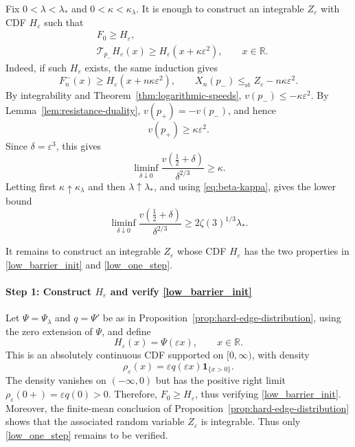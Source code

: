\documentclass[a4paper,fleqn]{cas-sc}
\numberwithin{equation}{section}
\theoremstyle{plain}
\theoremstyle{definition}
\newcommand{\stle}{\le_{\mathrm{st}}}
\begin{document}
Fix $0<\lambda<\lambda_*$ and $0<\kappa<\kappa_{\lambda}$.  It is enough to construct an
integrable \(Z_\varepsilon\) with CDF \(H_\varepsilon\) such that
\begin{align}
 &F_0\ge H_\varepsilon, \label{low_barrier_init}\\
 &\mathcal T_{p_-}H_\varepsilon(x)
 \ge H_\varepsilon(x+\kappa\varepsilon^2),
 \qquad x\in\mathbb R.\label{low_one_step}
\end{align}
Indeed, if such $H_\varepsilon$ exists, the same induction gives
\[
 F_n^-(x)\ge H_\varepsilon(x+n\kappa\varepsilon^2),
 \qquad
 X_n(p_-)\stle Z_\varepsilon-n\kappa\varepsilon^2.
\]
By integrability and Theorem~\ref{thm:logarithmic-speeds},
$v(p_-)\le-\kappa\varepsilon^2$.
By Lemma~\ref{lem:resistance-duality},
$v(p_+)=-v(p_-)$, and hence
\[
 v(p_+)\ge\kappa\varepsilon^2.
\]
Since $\delta=\varepsilon^3$, this gives
\[
 \liminf_{\delta\downarrow0}
 \frac{v(\frac12+\delta)}{\delta^{2/3}}
 \ge\kappa.
\]
Letting first $\kappa\uparrow\kappa_{\lambda}$ and then
$\lambda\uparrow\lambda_*$, and using \eqref{eq:beta-kappa},
gives the lower bound
\begin{equation}
 \liminf_{\delta\downarrow0}
 \frac{v(\frac12+\delta)}{\delta^{2/3}}
 \ge2\zeta(3)^{1/3}\lambda_*.
 \label{eq:sharp-lower-bound}
\end{equation}

It remains to construct an integrable $Z_\varepsilon$ whose CDF
$H_\varepsilon$ has the two properties in \eqref{low_barrier_init} and \eqref{low_one_step}.


\paragraph*{Step 1: Construct $H_\varepsilon$ and verify \eqref{low_barrier_init}}
Let $\Psi=\Psi_{\lambda}$ and $q=\Psi'$ be as in
Proposition~\ref{prop:hard-edge-distribution}, using the zero extension of
$\Psi$, and define
\[
H_\varepsilon(x)=\Psi(\varepsilon x),\qquad x\in\mathbb R.
\]
This is an absolutely continuous CDF supported on $[0,\infty)$,
with density
\[
\rho_\varepsilon(x)
=\varepsilon q(\varepsilon x)\mathbf 1_{\{x>0\}}.
\]
The density vanishes on $(-\infty,0)$
but has the positive right limit
$\rho_\varepsilon(0+)=\varepsilon q(0)>0$.
Therefore, $F_0\ge H_\varepsilon$, thus verifying \eqref{low_barrier_init}.
Moreover, the finite-mean conclusion of
Proposition~\ref{prop:hard-edge-distribution} shows that the associated random
variable $Z_\varepsilon$ is integrable.  Thus only \eqref{low_one_step} remains to be verified.
\end{document}
